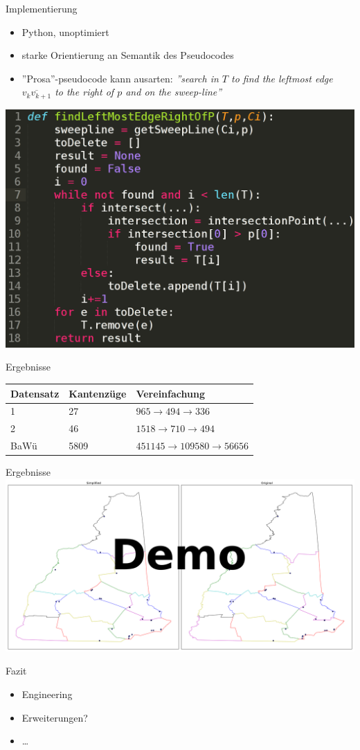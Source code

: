 \documentclass[14pt]{beamer}
\begin{document}
\begin{frame}{Implementierung}
  \begin{itemize}
  \item Python, unoptimiert
  \item starke Orientierung an Semantik des Pseudocodes
  \item ''Prosa''-pseudocode kann ausarten: {\small\emph{''search in $T$ to find the leftmost edge $\overline{v_kv_{k+1}}$ to the right of $p$ and on the
sweep-line''}}
\end{itemize}

\includegraphics[width=.6\textwidth,center]{img/implvspseudo.png}
\end{frame}

\begin{frame}{Ergebnisse}
  \begin{tabular}{l|l|l}
    Datensatz & Kantenzüge & Vereinfachung \\
    \hline \hline
    1 & 27 & $965 \rightarrow 494 \rightarrow 336$ \\
    2 & 46 & $1518 \rightarrow 710 \rightarrow 494$ \\
    BaWü & 5809 & $451145 \rightarrow 109580 \rightarrow 56656$
  \end{tabular}
\end{frame}

\begin{frame}{Ergebnisse}
\includegraphics[width=1.25\textwidth,center]{img/result_dataset1.pdf}
\end{frame}

\begin{frame}{Fazit}
  \begin{itemize}
	\item Engineering
	\item Erweiterungen?
	\item \dots
\end{itemize}
\end{frame}
\end{document}
